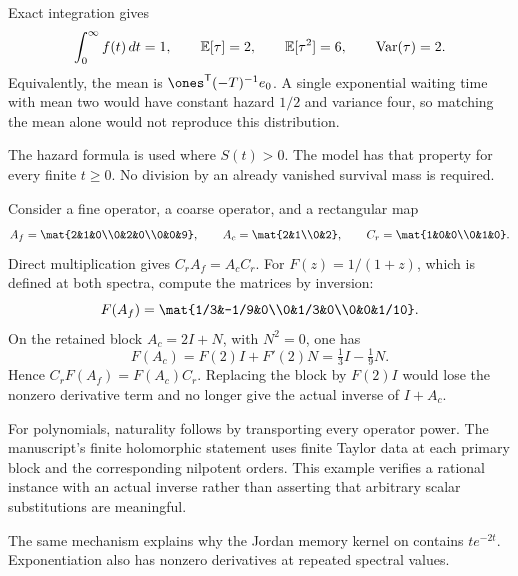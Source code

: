 Exact integration gives
\[
\int_0^\infty f(t)\,dt=1,\qquad
\EE[\tau]=2,\qquad \EE[\tau^2]=6,
\qquad \Var(\tau)=2.
\]
Equivalently, the mean is $\ones^{\mathsf T}(-T)^{-1}e_0$. A single exponential waiting time with mean two would have constant hazard $1/2$ and variance four, so matching the mean alone would not reproduce this distribution.

The hazard formula is used where $S(t)>0$. The model has that property for every finite $t\ge0$. No division by an already vanished survival mass is required.

Consider a fine operator, a coarse operator, and a rectangular map
\[
A_f=\mat{2&1&0\\0&2&0\\0&0&9},\qquad
A_c=\mat{2&1\\0&2},\qquad
C_r=\mat{1&0&0\\0&1&0}.
\]
Direct multiplication gives $C_rA_f=A_cC_r$. For $F(z)=1/(1+z)$, which is defined at both spectra, compute the matrices by inversion:
\[
F(A_f)=\mat{1/3&-1/9&0\\0&1/3&0\\0&0&1/10}.
\]
On the retained block $A_c=2I+N$, with $N^2=0$, one has
\[
F(A_c)=F(2)I+F'(2)N=\tfrac13I-\tfrac19N.
\]
Hence $C_rF(A_f)=F(A_c)C_r$. Replacing the block by $F(2)I$ would lose the nonzero derivative term and no longer give the actual inverse of $I+A_c$.

For polynomials, naturality follows by transporting every operator power. The manuscript's finite holomorphic statement uses finite Taylor data at each primary block and the corresponding nilpotent orders. This example verifies a rational instance with an actual inverse rather than asserting that arbitrary scalar substitutions are meaningful.

The same mechanism explains why the Jordan memory kernel on  contains $t e^{-2t}$. Exponentiation also has nonzero derivatives at repeated spectral values.

